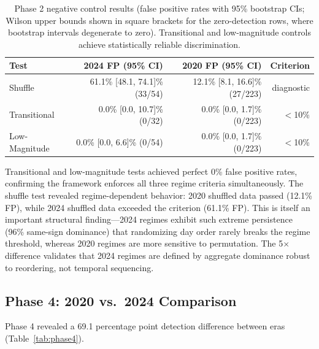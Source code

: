 \begin{table}[H]
\centering
\caption{Phase 2 negative control results (false positive rates with 95\% bootstrap CIs; Wilson upper bounds shown in square brackets for the zero-detection rows, where bootstrap intervals degenerate to zero). Transitional and low-magnitude controls achieve statistically reliable discrimination.}
\label{tab:negative_controls}
\begin{tabular}{@{}lrrr@{}}
\toprule
\textbf{Test} & \textbf{2024 FP (95\% CI)} & \textbf{2020 FP (95\% CI)} & \textbf{Criterion} \\
\midrule
Shuffle & 61.1\% [48.1, 74.1]\% (33/54) & 12.1\% [8.1, 16.6]\% (27/223) & diagnostic \\
Transitional & 0.0\% [0.0, 10.7]\% (0/32) & 0.0\% [0.0, 1.7]\% (0/223) & $<$10\% \\
Low-Magnitude & 0.0\% [0.0, 6.6]\% (0/54) & 0.0\% [0.0, 1.7]\% (0/223) & $<$10\% \\
\bottomrule
\end{tabular}
\end{table}

Transitional and low-magnitude tests achieved perfect 0\% false positive rates, confirming the framework enforces all three regime criteria simultaneously. The shuffle test revealed regime-dependent behavior: 2020 shuffled data passed (12.1\% FP), while 2024 shuffled data exceeded the criterion (61.1\% FP). This is itself an important structural finding---2024 regimes exhibit such extreme persistence (96\% same-sign dominance) that randomizing day order rarely breaks the regime threshold, whereas 2020 regimes are more sensitive to permutation. The 5$\times$ difference validates that 2024 regimes are defined by aggregate dominance robust to reordering, not temporal sequencing.

\subsection{Phase 4: 2020 vs.\ 2024 Comparison}

Phase 4 revealed a 69.1 percentage point detection difference between eras (Table~\ref{tab:phase4}).

